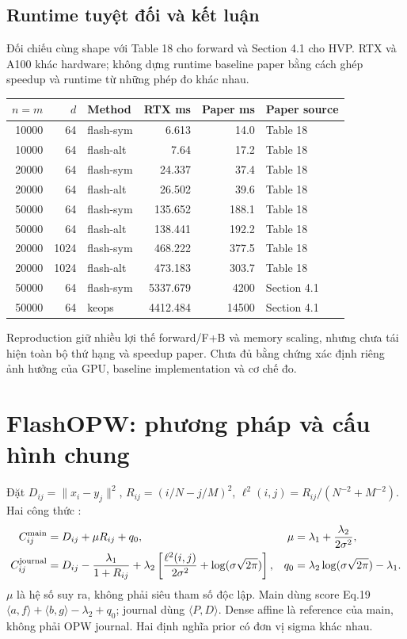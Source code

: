 \documentclass[11pt,a4paper]{article}
\begin{document}
\subsection{Runtime tuyệt đối và kết luận}
Đối chiếu cùng shape với Table 18 cho forward và Section 4.1 cho HVP.
RTX và A100 khác hardware; không dựng runtime baseline paper bằng cách ghép
speedup và runtime từ những phép đo khác nhau.
\begin{center}\footnotesize
\setlength{\tabcolsep}{5pt}
\begin{tabular}{@{}rrlrrl@{}}
\toprule
$n=m$ & $d$ & Method & RTX ms & Paper ms & Paper source \\
\midrule
10000 & 64 & flash-sym & 6.613 & 14.0 & Table 18 \\
10000 & 64 & flash-alt & 7.64 & 17.2 & Table 18 \\
20000 & 64 & flash-sym & 24.337 & 37.4 & Table 18 \\
20000 & 64 & flash-alt & 26.502 & 39.6 & Table 18 \\
50000 & 64 & flash-sym & 135.652 & 188.1 & Table 18 \\
50000 & 64 & flash-alt & 138.441 & 192.2 & Table 18 \\
20000 & 1024 & flash-sym & 468.222 & 377.5 & Table 18 \\
20000 & 1024 & flash-alt & 473.183 & 303.7 & Table 18 \\
50000 & 64 & flash-sym & 5337.679 & 4200 & Section 4.1 \\
50000 & 64 & keops & 4412.484 & 14500 & Section 4.1 \\
\bottomrule
\end{tabular}
\end{center}
Reproduction giữ nhiều lợi thế forward/F+B và memory scaling, nhưng chưa
tái hiện toàn bộ thứ hạng và speedup paper. Chưa đủ bằng chứng xác định
riêng ảnh hưởng của GPU, baseline implementation và cơ chế đo.

\section{FlashOPW: phương pháp và cấu hình chung}
\label{sec:opw-method}
Đặt $D_{ij}=\|x_i-y_j\|^2$, $R_{ij}=(i/N-j/M)^2$,
$\ell^2(i,j)=R_{ij}/(N^{-2}+M^{-2})$. Hai công thức \cite{mainpdf,journalpdf}:
\begin{align}
C^{\rm main}_{ij}&=D_{ij}+\mu R_{ij}+q_0,
&\mu&=\lambda_1+\frac{\lambda_2}{2\sigma^2},\\
C^{\rm journal}_{ij}&=D_{ij}-\frac{\lambda_1}{1+R_{ij}}
+\lambda_2\left[\frac{\ell^2(i,j)}{2\sigma^2}
+\log(\sigma\sqrt{2\pi})\right],
&q_0&=\lambda_2\log(\sigma\sqrt{2\pi})-\lambda_1.
\end{align}
$\mu$ là hệ số suy ra, không phải siêu tham số độc lập. Main dùng score
Eq.19 $\langle a,f\rangle+\langle b,g\rangle-\lambda_2+q_0$;
journal dùng $\langle P,D\rangle$. Dense affine là reference của main,
không phải OPW journal. Hai định nghĩa prior có đơn vị sigma khác nhau.
\end{document}
